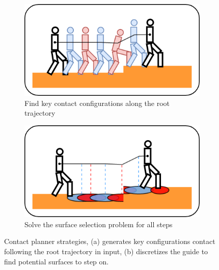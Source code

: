 \begin{figure}
    \captionsetup[subfigure]{justification=centering}
    \begin{subfigure}[t]{.49\linewidth}
    \includegraphics[width=\textwidth]{Figures/Chapter_LEAS/strategies_cp_guide_A.png}
    \caption{Find key contact configurations along the root trajectory\label{fig:strategies_cp_acyclic}}
    \end{subfigure}
    \begin{subfigure}[t]{.49\linewidth}
    \includegraphics[width=\textwidth]{Figures/Chapter_LEAS/strategies_cp_guide_B.png}
    \caption{Solve the surface selection problem for all steps\label{fig:strategies_cp_mip}}
    \end{subfigure}
    \caption{Contact planner strategies, (a) generates key configurations contact following the root trajectory in input, (b) discretizes the guide to find potential surfaces to step on.}
    \label{fig:strategies_cp}
\end{figure}

